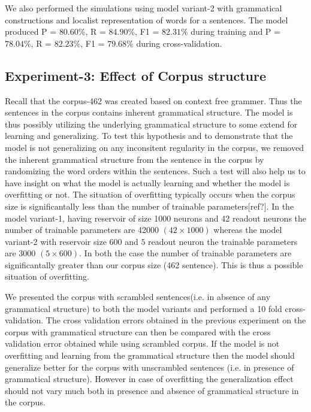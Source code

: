 We also performed the simulations using model variant-2 with grammatical constructions and localist representation of words for a sentences. The model produced P = $80.60 \%$, R = $84.90 \%$, F1 = $82.31 \%$ during training and P = $78.04 \%$, R = $82.23 \%$, F1 = $79.68 \%$ during cross-validation. 




\subsection{Experiment-3: Effect of Corpus structure} 

Recall that the corpus-462 was created based on context free grammer. Thus the sentences in the corpus contains inherent grammatical structure. The model is thus possibly utilizing the underlying grammatical structure to some extend for learning and generalizing. To test this hypothesis and to demonstrate that the model is not generalizing on any inconsitent regularity in the corpus, we removed the inherent grammatical structure from the sentence in the corpus by randomizing the word orders within the sentences. Such a test will also help us to have insight on what the model is actually learning and whether the model is overfitting or not. The situation of overfitting typically occurs when the corpus size is significantally less than the number of trainable parameters[ref?]. In the model variant-1, having reservoir of size 1000 neurons and 42 readout neurons the number of trainable parameters are 42000 $(42\times 1000)$  whereas the model variant-2 with reservoir size $600$ and $5$ readout neuron the trainable parameters are 3000 $(5 \times 600)$. In both the case the number of trainable parameters are significantally greater than our corpus size (462 sentence). This is thus a possible situation of overfitting.

We presented the corpus with scrambled sentences(i.e. in absence of any grammatical structure) to both the model variants and performed a 10 fold cross-validation. The cross validation errors obtained in the previous experiment on the corpus with grammatical structure can then be compared with the cross validation error obtained while using scrambled corpus. If the model is not overfitting and learning from the grammatical structure then the model should generalize better for the corpus with unscrambled sentences (i.e. in presence of grammatical structure). However in case of overfitting the generalization effect should not vary much both in presence and absence of grammatical structure in the corpus.

